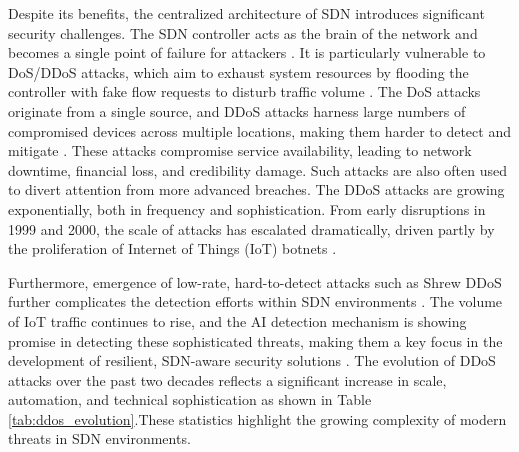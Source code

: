 \documentclass[ASNA,twocolumn]{USG} %
\begin{document}
Despite its benefits, the centralized architecture of SDN introduces significant security challenges. The SDN controller acts as the brain of the network \cite{paliwal2018controllers} and becomes a single point of failure for attackers \cite{eliyan2021and}. It is particularly vulnerable to DoS/DDoS attacks, which aim to exhaust system resources by flooding the controller with fake flow requests to disturb traffic volume \cite{de2023distributed}. The DoS attacks originate from a single source, and DDoS attacks harness large numbers of compromised devices across multiple locations, making them harder to detect and mitigate \cite{eliyan2021and}. These attacks compromise service availability, leading to network downtime, financial loss, and credibility damage. Such attacks are also often used to divert attention from more advanced breaches. The DDoS attacks are growing exponentially, both in frequency and sophistication. From early disruptions in 1999 and 2000, the scale of attacks has escalated dramatically, driven partly by the proliferation of Internet of Things (IoT) botnets \cite{gelgi2024systematic}. 

Furthermore, emergence of low-rate, hard-to-detect attacks such as Shrew DDoS further complicates the detection efforts within SDN environments \cite{singh2023shrew}. The volume of IoT traffic continues to rise, and the AI detection mechanism is showing promise in detecting these sophisticated threats, making them a key focus in the development of resilient, SDN-aware security solutions \cite{bala2024ai}. The evolution of DDoS attacks over the past two decades reflects a significant increase in scale, automation, and technical sophistication as shown in Table \ref{tab:ddos_evolution}.These statistics highlight the growing complexity of modern threats in SDN environments.
\end{document}

